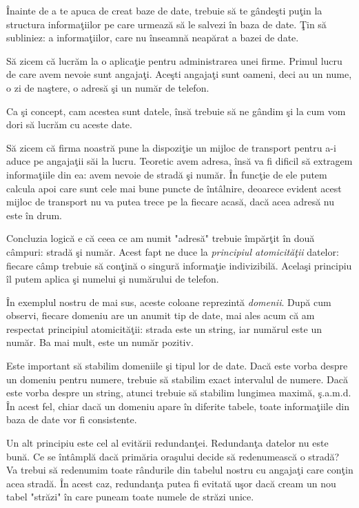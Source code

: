 Înainte de a te apuca de creat baze de date, trebuie să te gândeşti puţin
la structura informaţiilor pe care urmează să le salvezi în baza de date.
Ţin să subliniez: a informaţiilor, care nu înseamnă neapărat a bazei de date.

Să zicem că lucrăm la o aplicaţie pentru administrarea unei firme. Primul
lucru de care avem nevoie sunt angajaţi. Aceşti angajaţi sunt oameni, deci
au un nume, o zi de naştere, o adresă şi un număr de telefon.

Ca şi concept, cam acestea sunt datele, însă trebuie să ne gândim şi la cum
vom dori să lucrăm cu aceste date.

Să zicem că firma noastră pune la dispoziţie un mijloc de transport pentru
a-i aduce pe angajaţii săi la lucru. Teoretic avem adresa, însă va fi dificil
să extragem informaţiile din ea: avem nevoie de stradă şi număr. În funcţie de
ele putem calcula apoi care sunt cele mai bune puncte de întâlnire, deoarece
evident acest mijloc de transport nu va putea trece pe la fiecare acasă, dacă
acea adresă nu este în drum.

Concluzia logică e că ceea ce am numit "adresă" trebuie împărţit în două câmpuri:
stradă şi număr. Acest fapt ne duce la \textsl{principiul atomicităţii}
datelor: fiecare
câmp trebuie să conţină o singură informaţie indivizibilă. Acelaşi principiu îl
putem aplica şi numelui şi numărului de telefon.

În exemplul nostru de mai sus, aceste coloane reprezintă \textsl{domenii}. După
cum observi, fiecare domeniu are un anumit tip de date, mai ales acum că am
respectat principiul atomicităţii: strada este un string, iar numărul este un
număr. Ba mai mult, este un număr pozitiv.

Este important să stabilim domeniile şi tipul lor de date. Dacă este vorba despre
un domeniu pentru numere, trebuie să stabilim exact intervalul de numere. Dacă
este vorba despre un string, atunci trebuie să stabilim lungimea maximă, ş.a.m.d.
În acest fel, chiar dacă un domeniu apare în diferite tabele, toate informaţiile
din baza de date vor fi consistente.

Un alt principiu este cel al evitării redundanţei. Redundanţa datelor nu este
bună. Ce se întâmplă dacă primăria oraşului decide să redenumească o stradă?
Va trebui să redenumim toate rândurile din tabelul nostru cu angajaţi care
conţin acea stradă. În acest caz, redundanţa putea fi evitată uşor dacă
cream un nou tabel "străzi" în care puneam toate numele de străzi unice.

